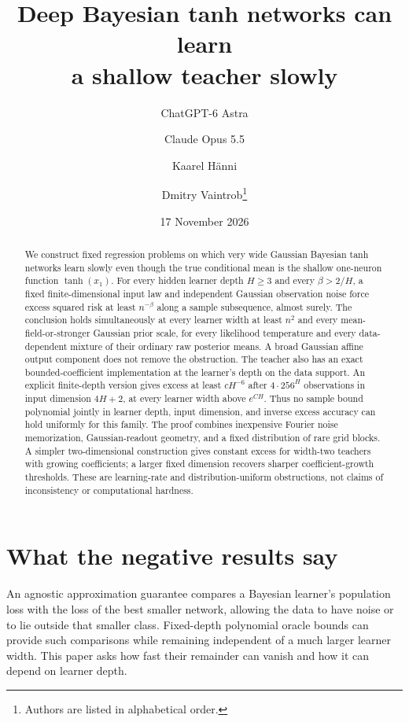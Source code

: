 \documentclass[11pt]{article}
\title{Deep Bayesian tanh networks can learn\\a shallow teacher slowly}
\author{ChatGPT-6 Astra \and Claude Opus 5.5 \and Kaarel H\"anni \and Dmitry Vaintrob\thanks{Authors are listed in alphabetical order.}}
\date{17 November 2026}
\begin{document}
\maketitle
\begin{abstract}
We construct fixed regression problems on which very wide Gaussian Bayesian tanh networks learn slowly even though the true conditional mean is the shallow one-neuron function $\tanh(x_1)$. For every hidden learner depth $H\ge3$ and every $\beta>2/H$, a fixed finite-dimensional input law and independent Gaussian observation noise force excess squared risk at least $n^{-\beta}$ along a sample subsequence, almost surely. The conclusion holds simultaneously at every learner width at least $n^2$ and every mean-field-or-stronger Gaussian prior scale, for every likelihood temperature and every data-dependent mixture of their ordinary raw posterior means. A broad Gaussian affine output component does not remove the obstruction. The teacher also has an exact bounded-coefficient implementation at the learner's depth on the data support. An explicit finite-depth version gives excess at least $cH^{-6}$ after $4\cdot256^H$ observations in input dimension $4H+2$, at every learner width above $e^{CH}$. Thus no sample bound polynomial jointly in learner depth, input dimension, and inverse excess accuracy can hold uniformly for this family. The proof combines inexpensive Fourier noise memorization, Gaussian-readout geometry, and a fixed distribution of rare grid blocks. A simpler two-dimensional construction gives constant excess for width-two teachers with growing coefficients; a larger fixed dimension recovers sharper coefficient-growth thresholds. These are learning-rate and distribution-uniform obstructions, not claims of inconsistency or computational hardness.
\end{abstract}

\section{What the negative results say}
An agnostic approximation guarantee compares a Bayesian learner's population loss with the loss of the best smaller network, allowing the data to have noise or to lie outside that smaller class. Fixed-depth polynomial oracle bounds can provide such comparisons while remaining independent of a much larger learner width. This paper asks how fast their remainder can vanish and how it can depend on learner depth.
\end{document}
